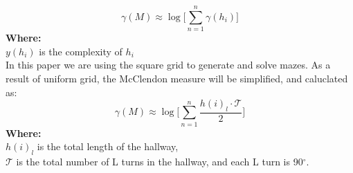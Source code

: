 \begin{equation}
\gamma(M) \approx \log \bigl[\sum_{n =1}^{n}\gamma(h_i)\bigr]
\end{equation}
\textbf{Where:}\\
$y(h_i)$ is the complexity of $h_i$\\ 
\newline
In this paper we are using the square grid to generate and solve mazes. As a result of uniform grid, the McClendon measure will be simplified, and caluclated as:
\begin{equation}
 \gamma(M) \approx \log  \bigl[\sum_{n =1}^{n}\frac{h(i)_l\cdot \mathcal{T}}{2}\bigr]
\end{equation}
\textbf{Where:}\\
$h(i)_l$ is the total length of the hallway,\\
$\mathcal{T}$ is the total number of L turns in the hallway, and each L turn is 90$^\circ$.

